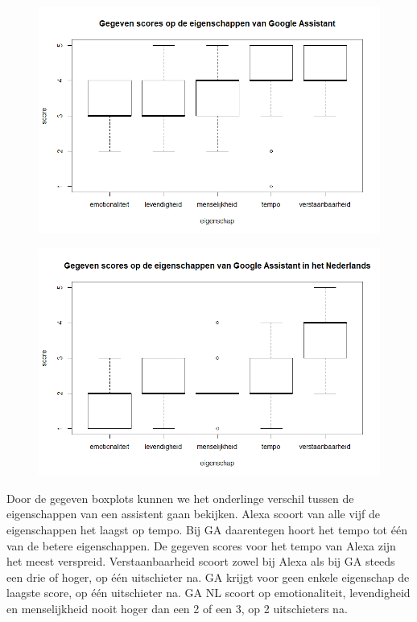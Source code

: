 \begin{figure}[H]
    \centering
    \includegraphics[width=0.9\linewidth]{../onderzoek/onderzoeksresultaten/vergelijking_eigenschappen_per_assistent/boxplot_score_eigenschappen_GA}
    \caption{}
    \label{fig:boxplot-ga}
\end{figure}

\begin{figure}[H]
    \centering
    \includegraphics[width=0.9\linewidth]{../onderzoek/onderzoeksresultaten/vergelijking_eigenschappen_per_assistent/boxplot_score_eigenschappen_GA_NL}
    \caption{}
    \label{fig:boxplot-ganl}
\end{figure}

Door de gegeven boxplots kunnen we het onderlinge verschil tussen de eigenschappen van een assistent gaan bekijken. Alexa scoort van alle vijf de eigenschappen het laagst op tempo. Bij \gls{GA} daarentegen hoort het tempo tot één van de betere eigenschappen. De gegeven scores voor het tempo van Alexa zijn het meest verspreid. 
Verstaanbaarheid scoort zowel bij Alexa als bij \gls{GA} steeds een drie of hoger, op één uitschieter na.
\gls{GA} krijgt voor geen enkele eigenschap de laagste score, op één uitschieter na.
\gls{GA NL} scoort op emotionaliteit, levendigheid en menselijkheid nooit hoger dan een 2 of een 3, op 2 uitschieters na.

